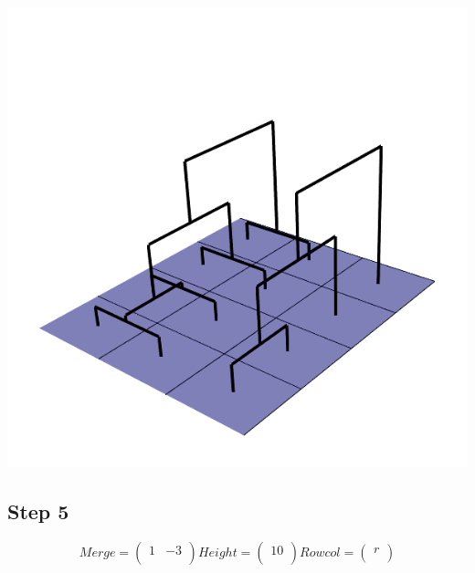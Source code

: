 \documentclass{article}
\begin{document}
\centering \includegraphics[scale=0.3]{step4}
\clearpage
\raggedright\subsection{Step 5}
\[
Merge =  \left(\begin{array}{cc}
1 & -3 \\
\end{array} \right)
%
Height = \left( \begin{array}{c}
10 \\
\end{array} \right)
%
Rowcol = \left( \begin{array}{c}
r \\
\end{array} \right)
\]  
\end{document}
